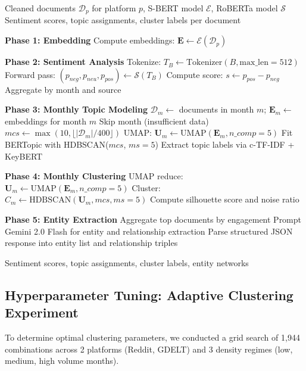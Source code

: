 \documentclass[12pt, letterpaper]{article}
\newenvironment{pseudoblock}[1]{%
  \begin{mdframed}[
    backgroundcolor=pseudobg,
    linecolor=pseudoframe,
    linewidth=1.5pt,
    frametitle={\color{pseudoframe}\bfseries\small Pseudo-code: #1},
    frametitlebackgroundcolor=pseudoframe!15
  ]
  \begin{algorithmic}[1]
}{%
  \end{algorithmic}
  \end{mdframed}
}
\begin{document}
\begin{pseudoblock}{Unified NLP Analysis Pipeline}
\REQUIRE Cleaned documents $\mathcal{D}_p$ for platform $p$, S-BERT model $\mathcal{E}$, RoBERTa model $\mathcal{S}$
\ENSURE Sentiment scores, topic assignments, cluster labels per document

\STATE \textbf{Phase 1: Embedding}
\STATE Compute embeddings: $\mathbf{E} \gets \mathcal{E}(\mathcal{D}_p)$ 

\STATE \textbf{Phase 2: Sentiment Analysis}
    \STATE Tokenize: $T_B \gets \text{Tokenizer}(B, \text{max\_len}=512)$
    \STATE Forward pass: $(p_{neg}, p_{neu}, p_{pos}) \gets \mathcal{S}(T_B)$
    \STATE Compute score: $s \gets p_{pos} - p_{neg}$
\ENDFOR
\STATE Aggregate by month and source

\STATE \textbf{Phase 3: Monthly Topic Modeling}
    \STATE $\mathcal{D}_m \gets$ documents in month $m$; $\mathbf{E}_m \gets$ embeddings for month $m$
        \STATE Skip month (insufficient data)
    \ENDIF
    \STATE $mcs \gets \max(10, \lfloor |\mathcal{D}_m| / 400 \rfloor)$
    \STATE UMAP: $\mathbf{U}_m \gets \text{UMAP}(\mathbf{E}_m, n\_comp=5)$
    \STATE Fit BERTopic with HDBSCAN($mcs$, $ms=5$)
    \STATE Extract topic labels via c-TF-IDF + KeyBERT
\ENDFOR

\STATE \textbf{Phase 4: Monthly Clustering}
    \STATE UMAP reduce: $\mathbf{U}_m \gets \text{UMAP}(\mathbf{E}_m, n\_comp=5)$
    \STATE Cluster: $C_m \gets \text{HDBSCAN}(\mathbf{U}_m, mcs, ms=5)$
    \STATE Compute silhouette score and noise ratio
\ENDFOR

\STATE \textbf{Phase 5: Entity Extraction}
    \STATE Aggregate top documents by engagement
    \STATE Prompt Gemini 2.0 Flash for entity and relationship extraction
    \STATE Parse structured JSON response into entity list and relationship triples
\ENDFOR

\RETURN Sentiment scores, topic assignments, cluster labels, entity networks
\end{pseudoblock}

\subsection{Hyperparameter Tuning: Adaptive Clustering Experiment}

To determine optimal clustering parameters, we conducted a grid search of 1,944 combinations across 2 platforms (Reddit, GDELT) and 3 density regimes (low, medium, high volume months).
\end{document}
